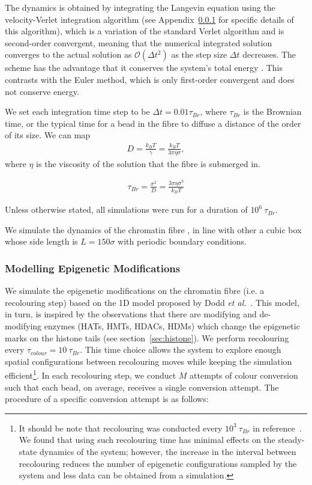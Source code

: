 \documentclass[12pt]{article}
\newcommand{\inc}{\Delta}
\newcommand{\etal}{\emph{et al.}}
\renewcommand{\O}[1]{\mathcal{O}(#1)}
\begin{document}
The dynamics is obtained by integrating the Langevin equation using the velocity-Verlet integration algorithm (see Appendix~\ref{} for specific details of this algorithm), which is a variation of the standard Verlet algorithm and is second-order convergent, meaning that the numerical integrated solution converges to the actual solution as $\O{\inc t^2}$ as the step size $\inc t$ decreases. The scheme has the advantage that it conserves the system's total energy . This contrasts with the Euler method, which is only first-order convergent and does not conserve energy. 

We set each integration time step to be $\Delta t = 0.01\tau_{Br}$, where $\tau_{Br}$ is the Brownian time, or the typical time for a bead in the fibre to diffuse a distance of the order of its size. We can map
\begin{eqnarray}
D = \frac{k_BT}{\gamma} = \frac{k_BT}{3\pi\eta\sigma},
\end{eqnarray}
where $\eta$ is the viscosity of the solution that the fibre is submerged in.

\begin{eqnarray}
\tau_{Br} = \frac{\sigma^2}{D} = \frac{3\pi\eta\sigma^3}{k_BT}
\end{eqnarray}

Unless otherwise stated, all simulations were run for a duration of $10^6~\tau_{Br}$.

We simulate the dynamics of the chromatin fibre , in line with other  a cubic box whose side length is $L = 150\sigma$ with periodic boundary conditions. 

\subsubsection{Modelling Epigenetic Modifications}
We simulate the epigenetic modifications on the chromatin fibre (i.e. a recolouring step) based on the 1D model proposed by Dodd \etal~\cite{dodd2007}. This model, in turn, is inspired by the observations that there are modifying and de-modifying enzymes (HATs, HMTs, HDACs, HDMs) which change the epigenetic marks on the histone tails (see section~\ref{sec:histone}). We perform recolouring every $\tau_{colour} = 10~\tau_{Br}$. This time choice allows the system to explore enough spatial configurations between recolouring moves while keeping the simulation efficient\footnote{It should be note that recolouring was conducted every $10^3~\tau_{Br}$ in reference~\cite{michieletto2016}. We found that using such recolouring time has minimal effects on the steady-state dynamics of the system; however, the increase in the interval between recolouring reduces the number of epigenetic configurations sampled by the system and less data can be obtained from a simulation.}. In each recolouring step, we conduct $M$ attempts of colour conversion such that each bead, on average, receives a single conversion attempt. The procedure of a specific conversion attempt is as follows: 
\end{document}

